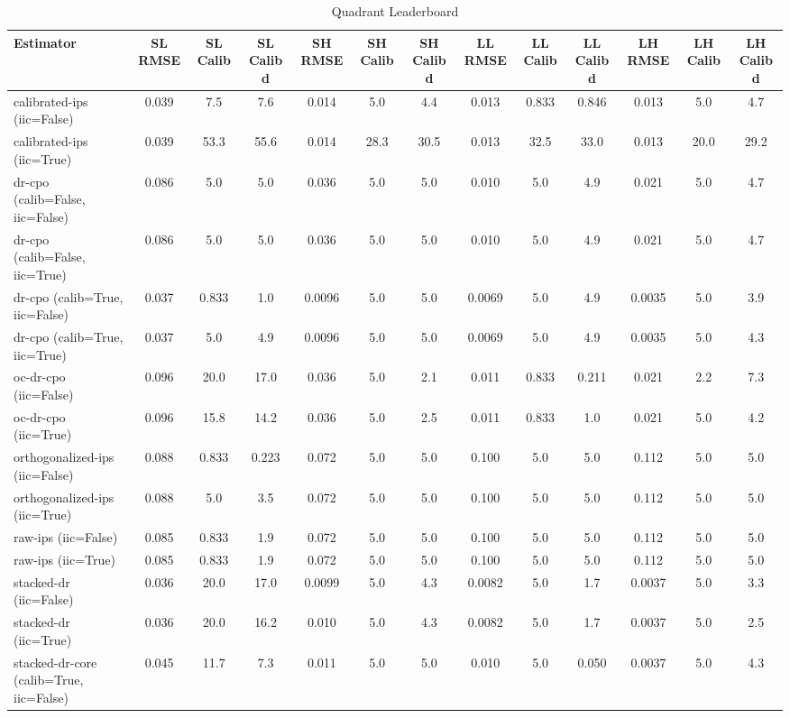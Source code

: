 \begin{table}[htbp]
\centering
\caption{Quadrant Leaderboard}
\label{tab:A1}
\begin{tabular}{l|cccccccccccc}
\toprule
Estimator & SL RMSE & SL Calib & SL Calib d & SH RMSE & SH Calib & SH Calib d & LL RMSE & LL Calib & LL Calib d & LH RMSE & LH Calib & LH Calib d \\
\midrule
calibrated-ips (iic=False) & 0.039 & 7.5 & 7.6 & 0.014 & 5.0 & 4.4 & 0.013 & 0.833 & 0.846 & 0.013 & 5.0 & 4.7 \\
calibrated-ips (iic=True) & 0.039 & 53.3 & 55.6 & 0.014 & 28.3 & 30.5 & 0.013 & 32.5 & 33.0 & 0.013 & 20.0 & 29.2 \\
dr-cpo (calib=False, iic=False) & 0.086 & 5.0 & 5.0 & 0.036 & 5.0 & 5.0 & 0.010 & 5.0 & 4.9 & 0.021 & 5.0 & 4.7 \\
dr-cpo (calib=False, iic=True) & 0.086 & 5.0 & 5.0 & 0.036 & 5.0 & 5.0 & 0.010 & 5.0 & 4.9 & 0.021 & 5.0 & 4.7 \\
dr-cpo (calib=True, iic=False) & 0.037 & 0.833 & 1.0 & 0.0096 & 5.0 & 5.0 & 0.0069 & 5.0 & 4.9 & 0.0035 & 5.0 & 3.9 \\
dr-cpo (calib=True, iic=True) & 0.037 & 5.0 & 4.9 & 0.0096 & 5.0 & 5.0 & 0.0069 & 5.0 & 4.9 & 0.0035 & 5.0 & 4.3 \\
oc-dr-cpo (iic=False) & 0.096 & 20.0 & 17.0 & 0.036 & 5.0 & 2.1 & 0.011 & 0.833 & 0.211 & 0.021 & 2.2 & 7.3 \\
oc-dr-cpo (iic=True) & 0.096 & 15.8 & 14.2 & 0.036 & 5.0 & 2.5 & 0.011 & 0.833 & 1.0 & 0.021 & 5.0 & 4.2 \\
orthogonalized-ips (iic=False) & 0.088 & 0.833 & 0.223 & 0.072 & 5.0 & 5.0 & 0.100 & 5.0 & 5.0 & 0.112 & 5.0 & 5.0 \\
orthogonalized-ips (iic=True) & 0.088 & 5.0 & 3.5 & 0.072 & 5.0 & 5.0 & 0.100 & 5.0 & 5.0 & 0.112 & 5.0 & 5.0 \\
raw-ips (iic=False) & 0.085 & 0.833 & 1.9 & 0.072 & 5.0 & 5.0 & 0.100 & 5.0 & 5.0 & 0.112 & 5.0 & 5.0 \\
raw-ips (iic=True) & 0.085 & 0.833 & 1.9 & 0.072 & 5.0 & 5.0 & 0.100 & 5.0 & 5.0 & 0.112 & 5.0 & 5.0 \\
stacked-dr (iic=False) & 0.036 & 20.0 & 17.0 & 0.0099 & 5.0 & 4.3 & 0.0082 & 5.0 & 1.7 & 0.0037 & 5.0 & 3.3 \\
stacked-dr (iic=True) & 0.036 & 20.0 & 16.2 & 0.010 & 5.0 & 4.3 & 0.0082 & 5.0 & 1.7 & 0.0037 & 5.0 & 2.5 \\
stacked-dr-core (calib=True, iic=False) & 0.045 & 11.7 & 7.3 & 0.011 & 5.0 & 5.0 & 0.010 & 5.0 & 0.050 & 0.0037 & 5.0 & 4.3 \\

\end{tabular}
\end{table}

